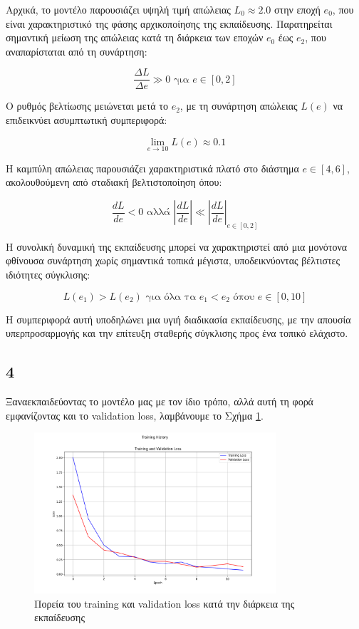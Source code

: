 \documentclass[a4paper,12pt]{article}
\begin{document}
Αρχικά, το μοντέλο παρουσιάζει υψηλή τιμή απώλειας $L_0 \approx 2.0$ στην εποχή $e_0$, που είναι χαρακτηριστικό της φάσης αρχικοποίησης της εκπαίδευσης.
Παρατηρείται σημαντική μείωση της απώλειας κατά τη διάρκεια των εποχών $e_0$ έως $e_2$, που αναπαρίσταται από τη συνάρτηση:

\[
    \frac{\Delta L}{\Delta e} \gg 0 \text{ για } e \in [0,2]
\]

Ο ρυθμός βελτίωσης μειώνεται μετά το $e_2$, με τη συνάρτηση απώλειας $L(e)$ να επιδεικνύει ασυμπτωτική συμπεριφορά:

\[
    \lim_{e \to 10} L(e) \approx 0.1
\]

Η καμπύλη απώλειας παρουσιάζει χαρακτηριστικά πλατό στο διάστημα $e \in [4,6]$, ακολουθούμενη από σταδιακή βελτιστοποίηση όπου:

\[
    \frac{d L}{d e} < 0 \text{ αλλά } \left|\frac{d L}{d e}\right| \ll \left|\frac{d L}{d e}\right|_{e \in [0,2]}
\]

Η συνολική δυναμική της εκπαίδευσης μπορεί να χαρακτηριστεί από μια μονότονα φθίνουσα συνάρτηση χωρίς σημαντικά τοπικά μέγιστα, υποδεικνύοντας βέλτιστες ιδιότητες σύγκλισης:

\[
    L(e_1) > L(e_2) \text{ για όλα τα } e_1 < e_2 \text{ όπου } e \in [0,10]
\]

Η συμπεριφορά αυτή υποδηλώνει μια υγιή διαδικασία εκπαίδευσης, με την απουσία υπερπροσαρμογής και την επίτευξη σταθερής σύγκλισης προς ένα τοπικό ελάχιστο.

\subsection*{4}

Ξαναεκπαιδεύοντας το μοντέλο μας με τον ίδιο τρόπο, αλλά αυτή τη φορά εμφανίζοντας και το validation loss, λαμβάνουμε το Σχήμα \ref{fig:tr_val_loss_plot_lstm}.

\begin{figure}[h]
    \centering
    \includegraphics[width=0.8\textwidth]{tr_val_loss_lstm.png}
    \caption{Πορεία του training και validation loss κατά την διάρκεια της εκπαίδευσης}
    \label{fig:tr_val_loss_plot_lstm}
\end{figure}
\end{document}

